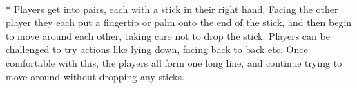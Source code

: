 \begin{minipage}{\textwidth}
\\*
Players get into pairs, each with a stick in their right hand.  Facing the other player they each put a fingertip or palm onto the end of the stick, and then begin to move around each other, taking care not to drop the stick.  Players can be challenged to try actions like lying down, facing back to back etc.  Once comfortable with this, the players all form one long line, and continue trying to move around without dropping any sticks.
\end{minipage}    \vfill
